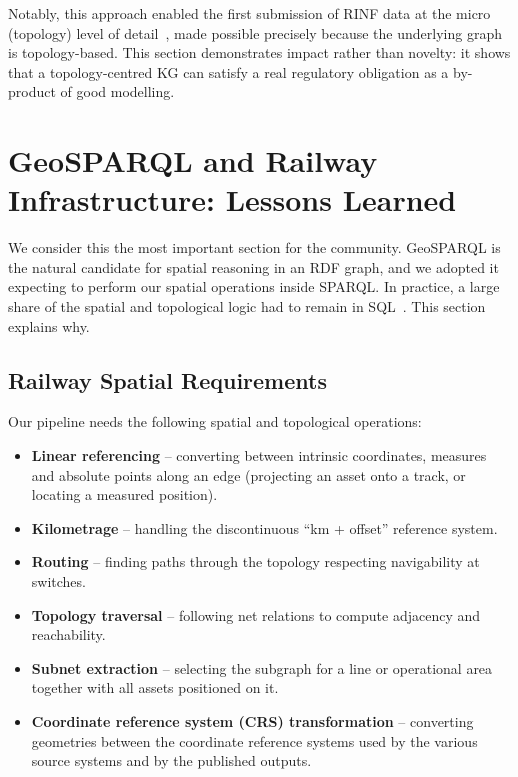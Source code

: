 \documentclass{ceurart}
\begin{document}
Notably, this approach enabled the first submission of RINF data at the micro
(topology) level of detail~\cite{dim}, made possible precisely because the
underlying graph is topology-based. This section demonstrates impact rather than
novelty: it shows that a topology-centred KG can satisfy a real regulatory
obligation as a by-product of good modelling.

\section{GeoSPARQL and Railway Infrastructure: Lessons Learned}
\label{sec:geosparql}

We consider this the most important section for the community. GeoSPARQL is the
natural candidate for spatial reasoning in an RDF graph, and we adopted it
expecting to perform our spatial operations inside SPARQL. In practice, a large
share of the spatial and topological logic had to remain in SQL~\cite{spatialite}. 
This section explains why.

\subsection{Railway Spatial Requirements}

Our pipeline needs the following spatial and topological operations:

\begin{itemize}
  \item \textbf{Linear referencing} -- converting between intrinsic coordinates,
        measures and absolute points along an edge (projecting an asset onto a
        track, or locating a measured position).
  \item \textbf{Kilometrage} -- handling the discontinuous ``km + offset''
        reference system.
  \item \textbf{Routing} -- finding paths through the topology respecting
        navigability at switches.
  \item \textbf{Topology traversal} -- following net relations to compute
        adjacency and reachability.
  \item \textbf{Subnet extraction} -- selecting the subgraph for a line or
        operational area together with all assets positioned on it.
  \item \textbf{Coordinate reference system (CRS) transformation} -- converting
        geometries between the coordinate reference systems used by the various
        source systems and by the published outputs.
\end{itemize}
\end{document}
